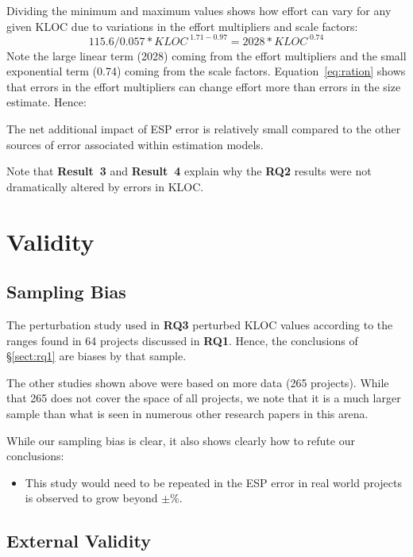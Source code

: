 \documentclass[final,twocolumn]{elsarticle}
\newcommand{\bi}{\begin{itemize}[leftmargin=0.4cm]}
\newcommand{\ei}{\end{itemize}}
\newcommand{\tion}[1]{\S\ref{sect:#1}}
\newcommand{\eq}[1]{Equation~\ref{eq:#1}}
\theoremstyle{break}
\begin{document}
Dividing the minimum and maximum values shows 
how    effort can vary for any given KLOC due to variations in the effort multipliers
and scale factors: 
\begin{equation}\label{eq:ration}
115.6/0.057 *\mathit{KLOC}^{\;1.71 - 0.97} = 2028*\mathit{KLOC}^{\;0.74}
\end{equation}
Note the large linear term (2028) coming from the effort multipliers and the
small exponential term (0.74) coming from the scale factors.
\eq{ration} shows that errors in the effort multipliers can change effort more than
errors in the size estimate.
Hence:

\begin{lesson}
  The net additional impact of ESP error is relatively small compared to the other sources of error associated within estimation models.
\end{lesson}

Note that {\bf Result~3} and {\bf Result~4}
explain why the {\bf RQ2} results were not dramatically altered
by errors in KLOC.
 
  

\section{Validity}


\subsection{Sampling Bias}

The perturbation study used in {\bf RQ3} perturbed KLOC values according to the
ranges found in 64 projects discussed in {\bf RQ1}. Hence, the conclusions of
\tion{rq1} are biases by that sample.

The other studies shown above were based on more data (265 projects).  While
that 265 does not cover the space of all projects, we note that it is a much
larger sample than what is seen in numerous other research papers in this arena.

While our sampling bias is clear, it also shows clearly how to refute our conclusions:
\bi
\item This study would need to be repeated in the ESP error in real world projects
  is observed to grow beyond $\pm$\%.
  \ei


\subsection{External Validity}
\end{document}
